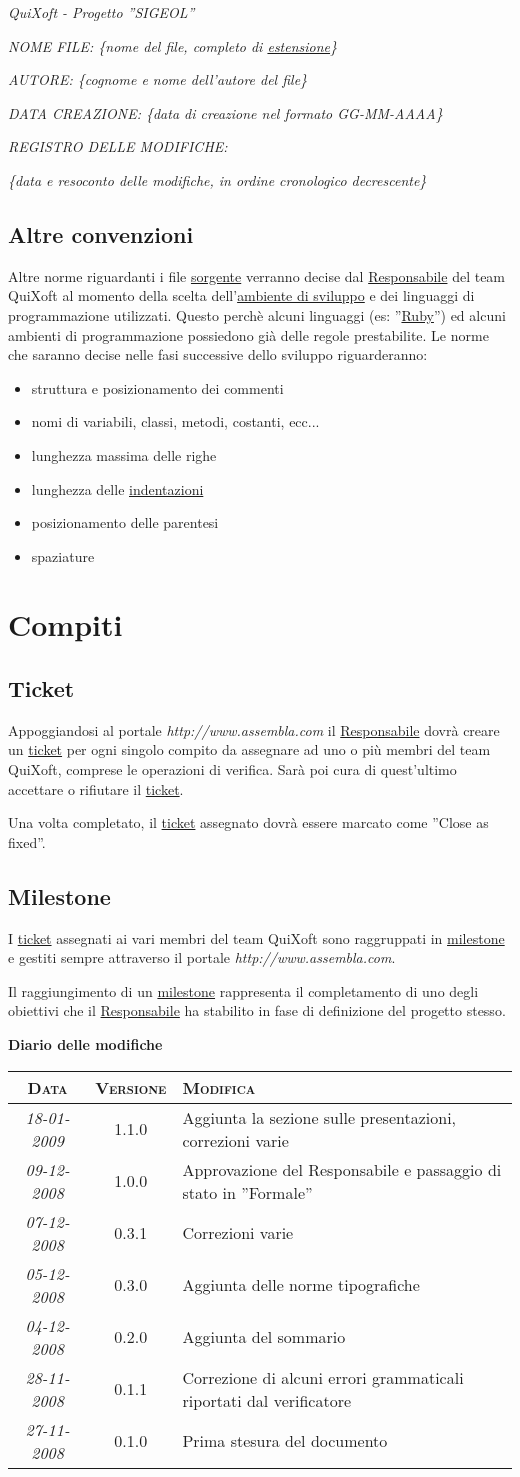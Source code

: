\documentclass[11pt,a4paper]{article}
\newcommand{\modifiche} 
{
\newpage
\begin{center}
\textbf{Diario delle modifiche} \\
\bigskip
\begin{tabular}{|c|c|p{0.62\textwidth}|}
\hline
\textsc{Data} & \textsc{Versione} & \textsc{Modifica} \\
\hline
\hline
\textit{18-01-2009} & 1.1.0 & Aggiunta la sezione sulle presentazioni, correzioni varie\\
\hline
\textit{09-12-2008} & 1.0.0 & Approvazione del Responsabile e passaggio di stato in ''Formale''\\
\hline
\textit{07-12-2008} & 0.3.1 & Correzioni varie \\
\hline
\textit{05-12-2008} & 0.3.0 & Aggiunta delle norme tipografiche \\
\hline
\textit{04-12-2008} & 0.2.0 & Aggiunta del sommario \\
\hline
\textit{28-11-2008} & 0.1.1 & Correzione di alcuni errori grammaticali riportati dal verificatore \\
\hline
\textit{27-11-2008} & 0.1.0 & Prima stesura del documento \\
\hline
\end{tabular}
\end{center}
}
\begin{document}
\textit{QuiXoft - Progetto ''SIGEOL''}

\textit{NOME FILE: \{nome del file, completo di \underline{estensione}\}}

\textit{AUTORE: \{cognome e nome dell'autore del file\}}

\textit{DATA CREAZIONE: \{data di creazione nel formato GG-MM-AAAA\}}

\textit{REGISTRO DELLE MODIFICHE:}

\textit{\{data e resoconto delle modifiche, in ordine cronologico decrescente\}}
\subsection{Altre convenzioni}
Altre norme riguardanti i file \underline{sorgente} verranno decise dal \underline{Responsabile} del team QuiXoft al momento della scelta dell'\underline{ambiente di sviluppo} e dei linguaggi di programmazione utilizzati. Questo perchè alcuni linguaggi (es: ''\underline{Ruby}'') ed alcuni ambienti di programmazione possiedono già delle regole prestabilite. Le norme che saranno decise nelle fasi successive dello sviluppo riguarderanno:
\begin{itemize}
	\item struttura e posizionamento dei commenti
	\item nomi di variabili, classi, metodi, costanti, ecc...
	\item lunghezza massima delle righe
	\item lunghezza delle \underline{indentazioni}
	\item posizionamento delle parentesi
	\item spaziature
\end{itemize}
\section{Compiti}
\subsection{Ticket}
Appoggiandosi al portale \textit{http://www.assembla.com} il \underline{Responsabile} dovrà creare un \underline{ticket} per ogni singolo compito da assegnare ad uno o più membri del team QuiXoft, comprese le operazioni di verifica.
Sarà poi cura di quest'ultimo accettare o rifiutare il \underline{ticket}.

Una volta completato, il \underline{ticket} assegnato dovrà essere marcato come ''Close as fixed''.
\subsection{Milestone}
I \underline{ticket} assegnati ai vari membri del team QuiXoft sono raggruppati in \underline{milestone} e gestiti sempre attraverso il portale \textit{http://www.assembla.com}.

Il raggiungimento di un \underline{milestone} rappresenta il completamento di uno degli obiettivi che il \underline{Responsabile} ha stabilito in fase di definizione del progetto stesso.
\modifiche
\end{document}
